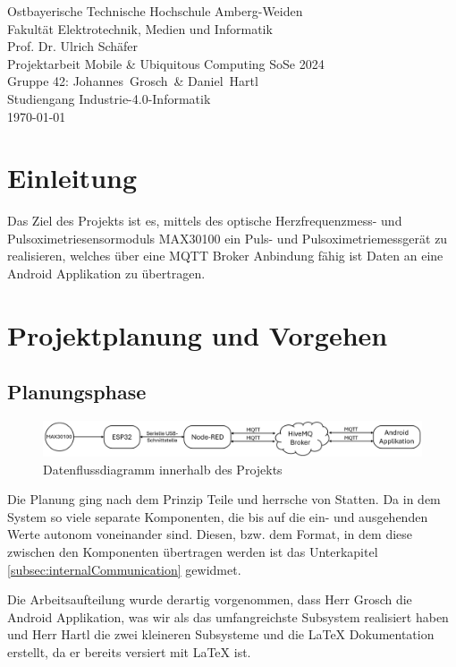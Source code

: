 \documentclass[12pt,oneside]{article}
\newcommand*{\IhrVornameEins}{Johannes}
\newcommand*{\IhrNachnameEins}{Grosch}
\newcommand*{\IhrVornameZwei}{Daniel}
\newcommand*{\IhrNachnameZwei}{Hartl}
\newcommand*{\IhreGruppe}{Gruppe 42}
\newcommand*{\IhrStudiengang}{Industrie-4.0-Informatik}
\newcommand*{\IhreArbeit}{Projektarbeit Mobile \& Ubiquitous Computing SoSe 2024}
\newcommand*{\IhrErstpruefer}{Prof. Dr. Ulrich Schäfer}
\newcommand{\quoteM}[1]{\glqq {#1}\grqq{}}
\begin{document}
  \thispagestyle{empty}
  \originalTeX
  \begin{center}
 	\Large
 	Ostbayerische Technische Hochschule Amberg-Weiden\\
 Fakultät Elektrotechnik, Medien und Informatik\\[.8cm]
 \large \IhrErstpruefer\\[.8cm]
 \Large \IhreArbeit\\[.8cm]
 \large \IhreGruppe: \IhrVornameEins\ \IhrNachnameEins\ \&
 \IhrVornameZwei\ \IhrNachnameZwei\\[.8cm]
 \large Studiengang \IhrStudiengang\\[.8cm]
 \today\\[2.5cm]
  \end{center}
  
  \tableofcontents

  \clearpage
  
  
  \section{Einleitung}
	Das Ziel des Projekts ist es, mittels des optische Herzfrequenzmess- und Pulsoximetriesensormoduls MAX30100\cite{max30100breakout} ein Puls- und Pulsoximetriemessgerät zu realisieren, welches über eine MQTT Broker Anbindung fähig ist Daten an eine Android Applikation zu übertragen.


  
  \section{Projektplanung und Vorgehen}
  \subsection{Planungsphase}
	\begin{figure}[tph!]
	 	\includegraphics[width=\textwidth]{kommunikationsdiagramm}
	 	\caption{Datenflussdiagramm innerhalb des Projekts}
	 	\label{fig:datadiagram}
	\end{figure}
	Die Planung ging nach dem Prinzip \quoteM{Divide et impera} Teile und herrsche von Statten. Da in dem System so viele separate Komponenten, die bis auf die ein- und ausgehenden Werte autonom voneinander sind. Diesen, bzw. dem Format, in dem diese zwischen den Komponenten übertragen werden ist das Unterkapitel \ref{subsec:internalCommunication} gewidmet.\par
	Die Arbeitsaufteilung wurde derartig vorgenommen, dass Herr Grosch die Android Applikation, was wir als das umfangreichste Subsystem realisiert haben und Herr Hartl die zwei kleineren Subsysteme und die \LaTeX{} Dokumentation erstellt, da er bereits versiert mit \LaTeX{} ist.
\end{document}
